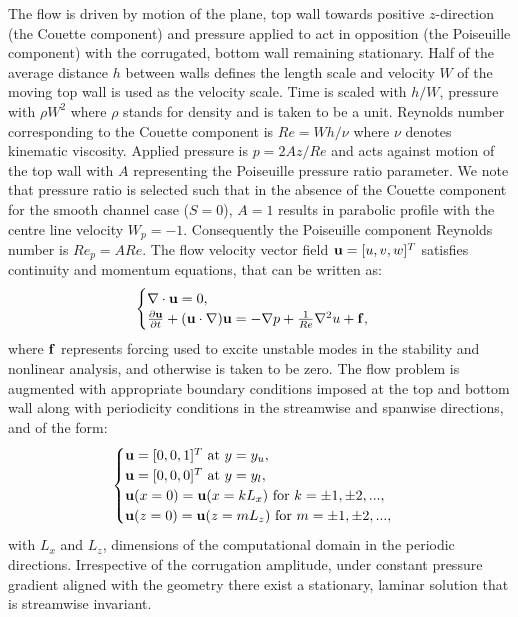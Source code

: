 \documentclass[lineno]{jfm}
\begin{document}
The flow is driven by motion of the plane, top wall towards positive $z$-direction (the Couette component) and pressure applied to act in opposition (the Poiseuille component) with the corrugated, bottom wall remaining stationary.
Half of the average distance $h$ between walls defines the length scale and velocity $W$ of the moving top wall is used as the velocity scale.
Time is scaled with ${h}/{W}$, pressure with $\rho W^2$ where $\rho$ stands for density and is taken to be a unit.
Reynolds number corresponding to the Couette component is $Re={W h}/{\nu}$ where $\nu$ denotes kinematic viscosity.
Applied pressure is $p=2A z/Re$ and acts against motion of the top wall with $A$ representing the Poiseuille pressure ratio parameter.
We note that pressure ratio is selected such that in the absence of the Couette component for the smooth channel case ($S=0$), $A=1$ results in parabolic profile with the centre line velocity $W_p=-1$.
Consequently the Poiseuille component Reynolds number is $Re_p=A Re$.
The flow velocity vector field ${\bf u}=[u, v, w]^T$ satisfies continuity and momentum equations, that can be written as:
\begin{equation}
\begin{cases}
\nabla \cdot {\bf u} = 0,\\
\frac{\partial {\bf u}}{\partial t} + ({\bf u} \cdot \nabla){\bf u} = -\nabla p + \frac{1}{Re} \nabla^2 u + {\bf f},\\
\end{cases}
\label{eq:NS}
\end{equation}
where $\bf f$ represents forcing used to excite
unstable modes in the stability and nonlinear analysis, and otherwise is taken to be zero.
The flow problem is augmented with appropriate boundary conditions imposed at the top and bottom wall
along with periodicity conditions in the streamwise and spanwise directions,
and of the form:
\begin{equation}
\begin{cases}
{\bf u} = [0, 0, 1]^T\text{ at } y=y_{u},\\
{\bf u} = [0, 0, 0]^T \text{ at } y=y_{l},\\
{\bf u}(x=0)={\bf u}(x=kL_x) \text{ for } k=\pm1,\pm2, \text{...},\\
{\bf u}(z=0)={\bf u}(z=mL_z) \text{ for } m=\pm1,\pm2, \text{...},
\end{cases}
\end{equation}
with $L_x$ and $L_z$, dimensions of the computational domain in the periodic directions.
Irrespective of the corrugation amplitude, under constant pressure gradient aligned with the geometry there exist a stationary, laminar solution that is streamwise invariant.
\end{document}
